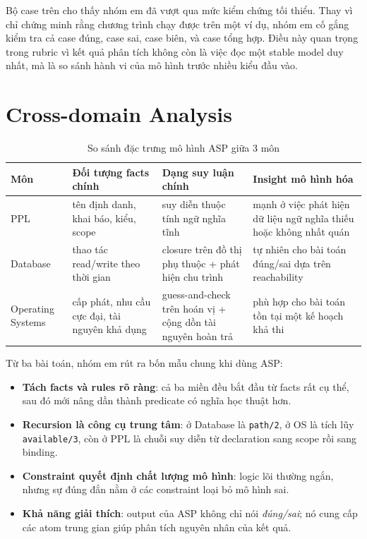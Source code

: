 ﻿\documentclass[11pt,a4paper]{article}
\begin{document}
Bộ case trên cho thấy nhóm em đã vượt qua mức kiểm chứng tối thiểu. Thay vì chỉ chứng minh rằng chương trình chạy được trên một ví dụ, nhóm em cố gắng kiểm tra cả case đúng, case sai, case biên, và case tổng hợp. Điều này quan trọng trong rubric vì kết quả phân tích không còn là việc đọc một stable model duy nhất, mà là so sánh hành vi của mô hình trước nhiều kiểu đầu vào.

\section{Cross-domain Analysis}
\begin{table}[h]
\centering
\begin{tabular}{p{2.5cm} p{3.2cm} p{3.8cm} p{4.0cm}}
\toprule
Môn & Đối tượng facts chính & Dạng suy luận chính & Insight mô hình hóa \\
\midrule
PPL & tên định danh, khai báo, kiểu, scope & suy diễn thuộc tính ngữ nghĩa tĩnh & mạnh ở việc phát hiện dữ liệu ngữ nghĩa thiếu hoặc không nhất quán \\
Database & thao tác read/write theo thời gian & closure trên đồ thị phụ thuộc + phát hiện chu trình & tự nhiên cho bài toán đúng/sai dựa trên reachability \\
Operating Systems & cấp phát, nhu cầu cực đại, tài nguyên khả dụng & guess-and-check trên hoán vị + cộng dồn tài nguyên hoàn trả & phù hợp cho bài toán tồn tại một kế hoạch khả thi \\
\bottomrule
\end{tabular}
\caption{So sánh đặc trưng mô hình ASP giữa 3 môn}
\end{table}

Từ ba bài toán, nhóm em rút ra bốn mẫu chung khi dùng ASP:
\begin{itemize}[leftmargin=1.5em]
  \item \textbf{Tách facts và rules rõ ràng}: cả ba miền đều bắt đầu từ facts rất cụ thể, sau đó mới nâng dần thành predicate có nghĩa học thuật hơn.
  \item \textbf{Recursion là công cụ trung tâm}: ở Database là \texttt{path/2}, ở OS là tích lũy \texttt{available/3}, còn ở PPL là chuỗi suy diễn từ declaration sang scope rồi sang binding.
  \item \textbf{Constraint quyết định chất lượng mô hình}: logic lõi thường ngắn, nhưng sự đúng đắn nằm ở các constraint loại bỏ mô hình sai.
  \item \textbf{Khả năng giải thích}: output của ASP không chỉ nói \textit{đúng/sai}; nó cung cấp các atom trung gian giúp phân tích nguyên nhân của kết quả.
\end{itemize}
\end{document}
